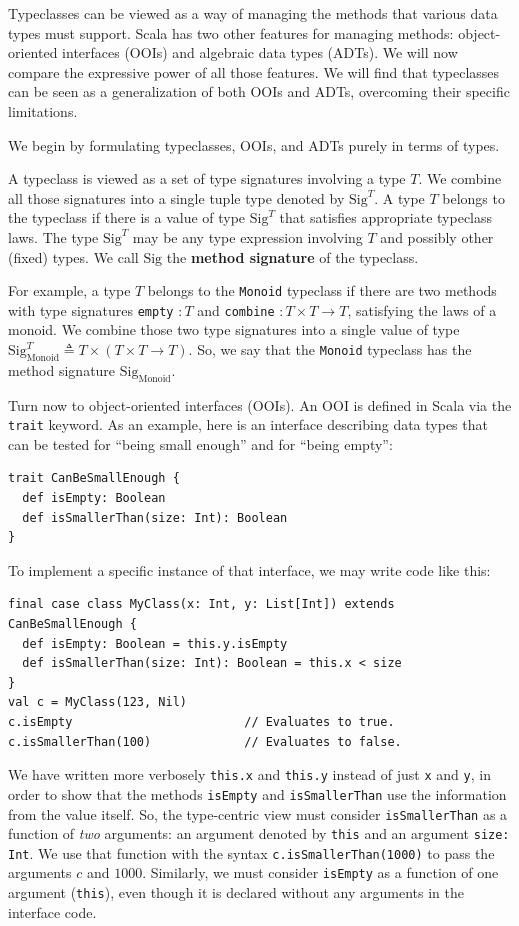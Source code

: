 Typeclasses can be viewed as a way of managing the methods that various
data types must support. Scala has two other features for managing
methods: object-oriented interfaces
(OOIs) and algebraic data types (ADTs).
We will now compare the expressive power of all those features. We
will find that typeclasses can be seen as a generalization of both
OOIs and ADTs, overcoming their specific limitations.

We begin by formulating typeclasses, OOIs, and ADTs purely in terms
of types. 

A typeclass is viewed as a set of type signatures involving a type
$T$. We combine all those signatures into a single tuple type denoted
by $\text{Sig}^{T}$. A type $T$ belongs to the typeclass if there
is a value of type $\text{Sig}^{T}$ that satisfies appropriate typeclass
laws. The type $\text{Sig}^{T}$ may be any type expression involving
$T$ and possibly other (fixed) types. We call $\text{Sig}$ the \textbf{method
signature} of the typeclass.

For example, a type $T$ belongs to the \lstinline!Monoid! typeclass
if there are two methods with type signatures \lstinline!empty! $:T$
and \lstinline!combine! $:T\times T\rightarrow T$, satisfying the
laws of a monoid. We combine those two type signatures into a single
value of type $\text{Sig}_{\text{Monoid}}^{T}\triangleq T\times(T\times T\rightarrow T)$.
So, we say that the \lstinline!Monoid! typeclass has the method signature
$\text{Sig}_{\text{Monoid}}$.

Turn now to object-oriented interfaces (OOIs). An OOI is defined in
Scala via the \lstinline!trait! keyword. As an example, here is an
interface describing data types that can be tested for \textsf{``}being small
enough\textsf{''} and for \textsf{``}being empty\textsf{''}:
\begin{lstlisting}
trait CanBeSmallEnough {
  def isEmpty: Boolean
  def isSmallerThan(size: Int): Boolean
}
\end{lstlisting}
To implement a specific instance of that interface, we may write code
like this:
\begin{lstlisting}
final case class MyClass(x: Int, y: List[Int]) extends CanBeSmallEnough {
  def isEmpty: Boolean = this.y.isEmpty
  def isSmallerThan(size: Int): Boolean = this.x < size
}
val c = MyClass(123, Nil)
c.isEmpty                        // Evaluates to true.
c.isSmallerThan(100)             // Evaluates to false.
\end{lstlisting}
We have written more verbosely \lstinline!this.x! and \lstinline!this.y!
instead of just \lstinline!x! and \lstinline!y!, in order to show
that the methods \lstinline!isEmpty! and \lstinline!isSmallerThan!
use the information from the value itself. So, the type-centric view
must consider \lstinline!isSmallerThan! as a function of \emph{two}
arguments: an argument denoted by \lstinline!this! and an argument
\lstinline!size: Int!. We use that function with the syntax \lstinline!c.isSmallerThan(1000)!
to pass the arguments $c$ and $1000$. Similarly, we must consider
\lstinline!isEmpty! as a function of one argument (\lstinline!this!),
even though it is declared without any arguments in the interface
code.

